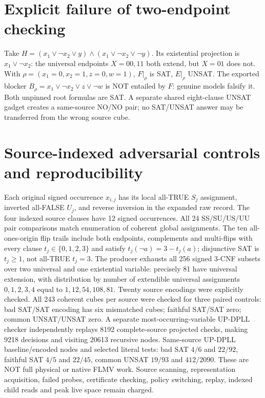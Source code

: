 \documentclass[11pt]{article}
\begin{document}
\section{Explicit failure of two-endpoint checking}
Take $H=(x_1\vee\neg x_2\vee y)\wedge(x_1\vee\neg x_2\vee\neg y)$.
Its existential projection is $x_1\vee\neg x_2$: the universal endpoints $X=00,11$ both extend, but $X=01$ does not. With $\rho=(x_1=0,x_2=1,z=0,w=1)$, $F|_\rho$ is SAT, $E|_\rho$ UNSAT. The exported blocker
$B_\rho=x_1\vee\neg x_2\vee z\vee\neg w$ is NOT entailed by $F$: genuine models falsify it. Both unpinned root formulas are SAT. A separate shared eight-clause UNSAT gadget creates a same-source NO/NO pair; no SAT/UNSAT answer may be transferred from the wrong source cube.
\section{Source-indexed adversarial controls and reproducibility}
Each original signed occurrence $x_{i,j}$ has its local all-TRUE $S_j$ assignment, inverted all-FALSE $U_j$, and reverse inversion in the expanded raw record. The four indexed source clauses have 12 signed occurrences. All 24 SS/SU/US/UU pair comparisons match enumeration of coherent global assignments. The ten all-ones-origin flip trails include both endpoints, complements and multi-flips with every clause $t_j\in\{0,1,2,3\}$ and satisfy $t_j(\neg a)=3-t_j(a)$; disjunctive SAT is $t_j\ge1$, not all-TRUE $t_j=3$.
The producer exhausts all 256 signed 3-CNF subsets over two universal and one existential variable: precisely 81 have universal extension, with distribution by number of extendible universal assignments $0,1,2,3,4$ equal to $1,12,54,108,81$. Twenty source encodings were explicitly checked. All 243 coherent cubes per source were checked for three paired controls: bad SAT/SAT encoding has six mismatched cubes; faithful SAT/SAT zero; common UNSAT/UNSAT zero. A separate most-occurring-variable UP-DPLL checker independently replays 8192 complete-source projected checks, making 9218 decisions and visiting 20613 recursive nodes. Same-source UP-DPLL baseline/encoded nodes and selected literal tests: bad SAT $4/6$ and $22/92$, faithful SAT $4/5$ and $22/45$, common UNSAT $19/93$ and $412/2090$. These are NOT full physical or native FLMV work. Source scanning, representation acquisition, failed probes, certificate checking, policy switching, replay, indexed child reads and peak live space remain charged.
\end{document}
